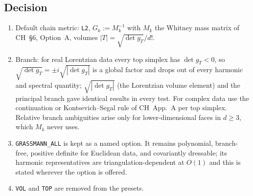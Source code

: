 \documentclass[11pt]{article}
\theoremstyle{definition}
\theoremstyle{plain}
\theoremstyle{remark}
\newcommand{\ttt}[1]{\texttt{#1}}
\newcommand{\Gram}{g}
\begin{document}
\subsection{Decision}
\begin{enumerate}[nosep]
\item Default chain metric: \ttt{L2}, \(G_k:=M_k^{-1}\) with \(M_k\) the Whitney mass matrix of CH~\S6, Option~A, volumes \(|T|=\sqrt{\det\Gram_T}/d!\).
\item Branch: for real Lorentzian data every top simplex has \(\det\Gram_T<0\), so \(\sqrt{\det\Gram_T}=\pm i\sqrt{|\det\Gram_T|}\) is a global factor and drops out of every harmonic and spectral quantity; \(\sqrt{|\det\Gram_T|}\) (the Lorentzian volume element) and the principal branch gave identical results in every test. For complex data use the continuation or Kontsevich--Segal rule of CH~App.~A per top simplex. Relative branch ambiguities arise only for lower-dimensional faces in \(d\ge3\), which \(M_k\) never uses.
\item \ttt{GRASSMANN\_ALL} is kept as a named option. It remains polynomial, branch-free, positive definite for Euclidean data, and covariantly dressable; its harmonic representatives are triangulation-dependent at \(O(1)\) and this is stated wherever the option is offered.
\item \ttt{VOL} and \ttt{TOP} are removed from the presets.
\end{enumerate}
\end{document}
